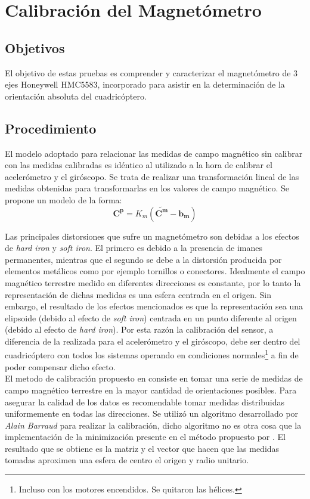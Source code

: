 \documentclass[main]{subfiles}
\begin{document}
\chapter{Calibraci\'on del Magnetómetro}
\label{chap:magnetometro}

\section{Objetivos}

El objetivo de estas pruebas es comprender y caracterizar el magnetómetro de 3 ejes Honeywell HMC5583, incorporado para asistir en la determinación de la orientación absoluta del cuadricóptero.

\section{Procedimiento}
\label{sec:procedimiento}

El modelo adoptado para relacionar las medidas de campo magnético sin calibrar con las medidas calibradas es idéntico al utilizado a la hora de calibrar el acelerómetro y el giróscopo. Se trata de realizar una transformación lineal de las medidas obtenidas para transformarlas en los valores de campo magnético. Se propone un modelo de la forma:
$$
\mathbf{C^p} =K_m (\mathbf{\tilde{C^m}} -  \mathbf{b_m})
$$

Las principales distorsiones que sufre un magnet\'ometro son debidas a los efectos de \emph{hard iron} y \emph{soft iron}. El primero es debido a la presencia de imanes permanentes, mientras que el segundo se debe a la distorsi\'on producida por elementos met\'alicos como por ejemplo tornillos o conectores. Idealmente el campo magn\'etico terrestre medido en diferentes direcciones es constante, por lo tanto la representaci\'on de dichas medidas es una esfera centrada en el origen. Sin embargo, el resultado de los efectos mencionados es que la representaci\'on sea una elipsoide (debido al efecto de \emph{soft iron}) centrada en un punto diferente al origen (debido al efecto de \emph{hard iron}). Por esta raz\'on la calibraci\'on del sensor, a diferencia de la realizada para el aceler\'ometro y el gir\'oscopo, debe ser dentro del cuadric\'optero con todos los sistemas operando en condiciones normales\footnote{Incluso con los motores encendidos. Se quitaron las h\'elices.} a fin de poder compensar dicho efecto.\\


El metodo de calibraci\'on propuesto en \cite{bib:bola} consiste en tomar una serie de medidas de campo magnético terrestre en la mayor cantidad de  orientaciones posibles. Para asegurar la calidad de los datos es recomendable tomar medidas distribuidas uniformemente en todas las direcciones. Se utilizó un algoritmo desarrollado por \emph{Alain Barraud} para realizar la calibración, dicho algoritmo no es otra cosa que la implementación de la minimización presente en el método propuesto por \cite{bib:bola}. El resultado que se obtiene es la matriz y el vector que hacen que las medidas tomadas aproximen una esfera de centro el origen y radio unitario.\\
\end{document}
